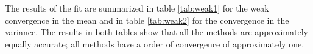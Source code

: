 \documentclass[a4paper,onecolumn]{IEEEtran}
\begin{document}
The results of the fit are summarized in table \ref{tab:weak1} for the weak
convergence in the mean and in table \ref{tab:weak2} for the convergence in
the variance. The results in both tables show that all the methods
are approximately equally accurate; all methods have a order of convergence
of approximately one.




	
\end{document}
